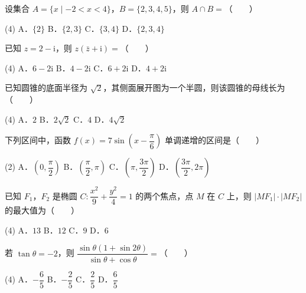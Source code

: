 \begin{question}
设集合 $A=\{x\mid-2<x<4\}$，$B=\{2,3,4,5\}$，则 $A\cap B=$\mbox{（　　）}

\begin{gkopts}(4)
\task A．$\{2\}$
\task B．$\{2,3\}$
\task C．$\{3,4\}$
\task D．$\{2,3,4\}$
\end{gkopts}

\end{question}
\begin{question}
已知 $z=2-\mathrm i$，则 $z(\bar z+\mathrm i)=$\mbox{（　　）}

\begin{gkopts}(4)
\task A．$6-2\mathrm i$
\task B．$4-2\mathrm i$
\task C．$6+2\mathrm i$
\task D．$4+2\mathrm i$
\end{gkopts}

\end{question}
\begin{question}
已知圆锥的底面半径为 $\sqrt2$，其侧面展开图为一个半圆，则该圆锥的母线长为\mbox{（　　）}

\begin{gkopts}(4)
\task A．$2$
\task B．$2\sqrt2$
\task C．$4$
\task D．$4\sqrt2$
\end{gkopts}

\end{question}
\begin{question}
下列区间中，函数 $f(x)=7\sin\left(x-\dfrac\pi6\right)$ 单调递增的区间是\mbox{（　　）}

\begin{gkopts}(2)
\task A．$\left(0,\dfrac\pi2\right)$
\task B．$\left(\dfrac\pi2,\pi\right)$
\task C．$\left(\pi,\dfrac{3\pi}2\right)$
\task D．$\left(\dfrac{3\pi}2,2\pi\right)$
\end{gkopts}

\end{question}
\begin{question}
已知 $F_1$，$F_2$ 是椭圆 $C:\dfrac{x^{2}}9+\dfrac{y^{2}}4=1$ 的两个焦点，点 $M$ 在 $C$ 上，则 $\left|MF_1\right|\cdot\left|MF_2\right|$ 的最大值为\mbox{（　　）}

\begin{gkopts}(4)
\task A．$13$
\task B．$12$
\task C．$9$
\task D．$6$
\end{gkopts}

\end{question}
\begin{question}
若 $\tan\theta=-2$，则 $\dfrac{\sin\theta(1+\sin2\theta)}{\sin\theta+\cos\theta}=$\mbox{（　　）}

\begin{gkopts}(4)
\task A．$-\dfrac65$
\task B．$-\dfrac25$
\task C．$\dfrac25$
\task D．$\dfrac65$
\end{gkopts}

\end{question}
